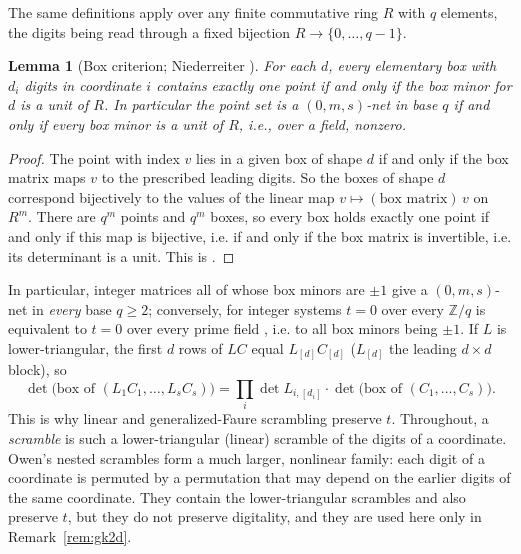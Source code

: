 \documentclass[11pt]{amsart}
\newtheorem{lemma}[theorem]{Lemma}
\theoremstyle{definition}
\theoremstyle{plain}
\newcommand{\Z}{\mathbb{Z}}
\begin{document}
The same definitions apply over any finite commutative ring $R$ with $q$ elements, the digits being read through a fixed bijection $R\to\{0,\dots,q-1\}$.

\begin{lemma}[Box criterion; {Niederreiter \cite[Thm.~6.1]{Nie87}}]\label{lem:nie}
For each $d$, every elementary box with $d_i$ digits in coordinate $i$ contains exactly one point if and only if the box minor for $d$ is a unit of $R$. In particular the point set is a $(0,m,s)$-net in base $q$ if and only if every box minor is a unit of $R$, i.e., over a field, nonzero.
\end{lemma}

\begin{proof}
The point with index $v$ lies in a given box of shape $d$ if and only if the box matrix maps $v$ to the prescribed leading digits. So the boxes of shape $d$ correspond bijectively to the values of the linear map $v\mapsto(\text{box matrix})\,v$ on $R^m$. There are $q^m$ points and $q^m$ boxes, so every box holds exactly one point if and only if this map is bijective, i.e. if and only if the box matrix is invertible, i.e. its determinant is a unit. This is \cite[Thm.~6.1]{Nie87}.
\end{proof}

In particular, integer matrices all of whose box minors are $\pm1$ give a $(0,m,s)$-net in \emph{every} base $q\ge2$; conversely, for integer systems $t=0$ over every $\Z/q$ is equivalent to $t=0$ over every prime field \cite[Lemmas~8--9]{LNS96}, i.e. to all box minors being $\pm1$. If $L$ is lower-triangular, the first $d$ rows of $LC$ equal $L_{[d]}C_{[d]}$ ($L_{[d]}$ the leading $d\times d$ block), so
\begin{equation}\label{eq:scr}
\det\text{(box of }(L_1C_1,\dots,L_sC_s))=\textstyle\prod_{i}\det L_{i,[d_i]}\cdot\det\text{(box of }(C_1,\dots,C_s)).
\end{equation}
This is why linear \cite{Mat98} and generalized-Faure \cite{Tez95} scrambling preserve $t$. Throughout, a \emph{scramble} is such a lower-triangular (linear) scramble of the digits of a coordinate. Owen's nested scrambles \cite{Owe95} form a much larger, nonlinear family: each digit of a coordinate is permuted by a permutation that may depend on the earlier digits of the same coordinate. They contain the lower-triangular scrambles and also preserve $t$, but they do not preserve digitality, and they are used here only in Remark~\ref{rem:gk2d}.
\end{document}
